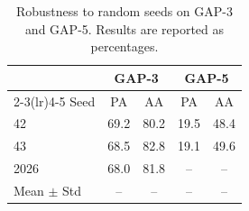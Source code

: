 \begin{table}[H]
\centering
\caption{Robustness to random seeds on GAP-3 and GAP-5. Results are reported as percentages.}
\label{tab:seed}
\renewcommand{\arraystretch}{1.15}
\setlength{\tabcolsep}{3pt}
\begin{tabular*}{\columnwidth}{@{\extracolsep{\fill}}lcccc@{}}
\toprule
& \multicolumn{2}{c}{GAP-3} & \multicolumn{2}{c}{GAP-5} \\
\cmidrule(lr){2-3}\cmidrule(lr){4-5}
Seed & PA & AA & PA & AA \\
\midrule
42 & 69.2 & 80.2 & 19.5 & 48.4 \\
43 & 68.5 & 82.8 &19.1 & 49.6 \\
2026 & 68.0 & 81.8 & -- & -- \\
\midrule
Mean $\pm$ Std & -- & -- & -- & -- \\
\bottomrule
\end{tabular*}
\end{table}